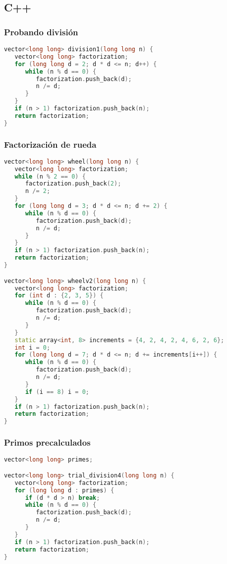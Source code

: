 \subsection{C++}

\subsubsection{Probando división}
\begin{lstlisting}[language=C++]
vector<long long> division1(long long n) {
   vector<long long> factorization;
   for (long long d = 2; d * d <= n; d++) {
      while (n % d == 0) {
         factorization.push_back(d);
         n /= d;
      }
   }
   if (n > 1) factorization.push_back(n);
   return factorization;
}

\end{lstlisting}

\subsubsection{Factorización de rueda}
\begin{lstlisting}[language=C++]
vector<long long> wheel(long long n) {
   vector<long long> factorization;
   while (n % 2 == 0) {
      factorization.push_back(2);
      n /= 2;
   }
   for (long long d = 3; d * d <= n; d += 2) {
      while (n % d == 0) {
         factorization.push_back(d);
         n /= d;
      }
   }
   if (n > 1) factorization.push_back(n);
   return factorization;
}

vector<long long> wheelv2(long long n) {
   vector<long long> factorization;
   for (int d : {2, 3, 5}) {
      while (n % d == 0) {
         factorization.push_back(d);
         n /= d;
      }
   }
   static array<int, 8> increments = {4, 2, 4, 2, 4, 6, 2, 6};
   int i = 0;
   for (long long d = 7; d * d <= n; d += increments[i++]) {
      while (n % d == 0) {
         factorization.push_back(d);
         n /= d;
      }
      if (i == 8) i = 0;
   }
   if (n > 1) factorization.push_back(n);
   return factorization;
}
\end{lstlisting} 

\subsubsection{Primos precalculados}
\begin{lstlisting}[language=C++]
vector<long long> primes;

vector<long long> trial_division4(long long n) {
   vector<long long> factorization;
   for (long long d : primes) {
      if (d * d > n) break;
      while (n % d == 0) {
         factorization.push_back(d);
         n /= d;
      }
   }
   if (n > 1) factorization.push_back(n);
   return factorization;
}
\end{lstlisting} 

